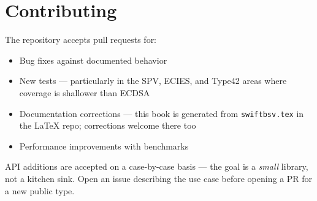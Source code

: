 \documentclass[a4paper, 11pt, openany]{book}
\begin{document}
\section{Contributing}

The repository accepts pull requests for:

\begin{itemize}
\item Bug fixes against documented behavior
\item New tests --- particularly in the SPV, ECIES, and Type42 areas where coverage is shallower than ECDSA
\item Documentation corrections --- this book is generated from \texttt{swiftbsv.tex} in the LaTeX repo; corrections welcome there too
\item Performance improvements with benchmarks
\end{itemize}

API additions are accepted on a case-by-case basis --- the goal is a \emph{small} library, not a kitchen sink. Open an issue describing the use case before opening a PR for a new public type.
\end{document}
